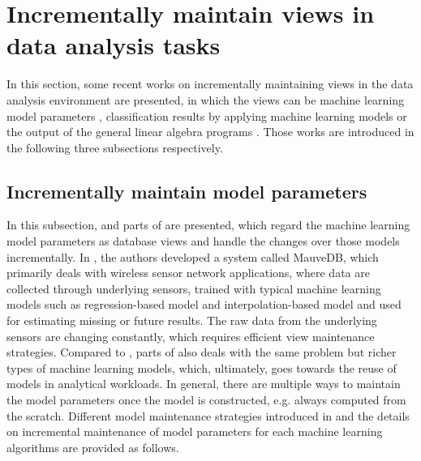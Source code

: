 \section{Incrementally maintain views in data analysis tasks}\label{sec: maintain_views}
In this section, some recent works on incrementally maintaining views in the data analysis environment are presented, in which the views can be machine learning model parameters \cite{deshpande2006mauvedb, gupta2015processing}, classification results by applying machine learning models \cite{koc2011incrementally} or the output of the general linear algebra programs \cite{nikolic2014linview}. Those works are introduced in the following three subsections respectively. 


\subsection{Incrementally maintain model parameters}\label{sec: maintain_model_para}
In this subsection, \cite{deshpande2006mauvedb} and parts of \cite{gupta2015processing} are presented, which regard the machine learning model parameters as database views and handle the changes over those models incrementally. In \cite{deshpande2006mauvedb}, the authors developed a system called MauveDB, which primarily deals with wireless sensor network applications, where data are collected through underlying sensors, trained with typical machine learning models such as regression-based model and interpolation-based model and used for estimating missing or future results. 
The raw data from the underlying sensors are changing constantly, which requires efficient view maintenance strategies. 
Compared to \cite{deshpande2006mauvedb}, parts of \cite{gupta2015processing} also deals with the same problem but richer types of machine learning models, which, ultimately, goes towards the reuse of models in analytical workloads. In general, there are multiple ways to maintain the model parameters once the model is constructed, e.g. always computed from the scratch. Different model maintenance strategies introduced in \cite{deshpande2006mauvedb} and the details on incremental maintenance of model parameters for each machine learning algorithms are provided as follows.



